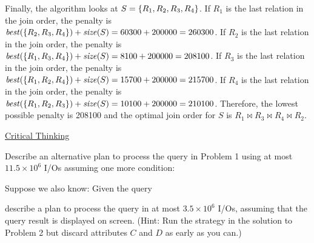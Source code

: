 \begin{sol}
    Finally, the algorithm looks at $S = \{R_1, R_2, R_3, R_4\}$. If $R_1$ is the last relation in the join order, the penalty is $\mathit{best}(\{R_2, R_3, R_4\}) + \mathit{size}(S) = 60300 + 200000 = 260300$. If $R_2$ is the last relation in the join order, the penalty is $\mathit{best}(\{R_1, R_3, R_4\}) + \mathit{size}(S) = 8100 + 200000 = 208100$.
    If $R_3$ is the last relation in the join order, the penalty is $\mathit{best}(\{R_1, R_2, R_4\}) + \mathit{size}(S) = 15700 + 200000 = 215700$.
    If $R_4$ is the last relation in the join order, the penalty is $\mathit{best}(\{R_1, R_2, R_3\}) + \mathit{size}(S) = 10100 + 200000 = 210100$. Therefore, the lowest possible penalty is 208100 and the optimal join order for $S$ is $R_1 \bowtie R_3 \bowtie R_4 \bowtie R_2$.
\end{sol}


\vgap

\begin{center}
    \uline{Critical Thinking}
\end{center}



 Describe an alternative plan to process the query in Problem 1 using at most $11.5 \times 10^6$ I/Os assuming one more condition:

%
%
%


 Suppose we also know:
Given the query



\noindent describe a plan to process the query in at most $3.5 \times 10^6$ I/Os, assuming that the query result is displayed on screen.
(Hint: Run the strategy in the solution to Problem 2 but discard attributes $C$ and $D$ as early as you can.)


